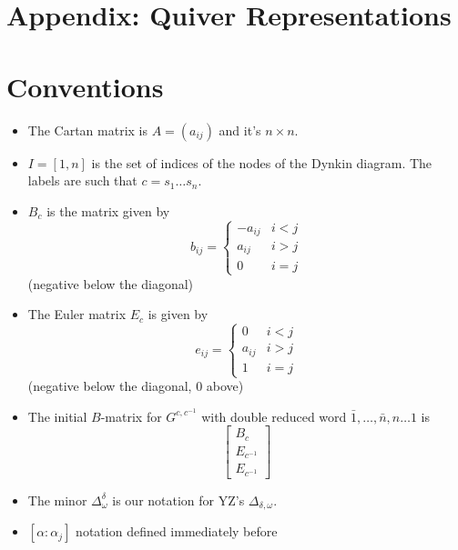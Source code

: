 \documentclass[12pt]{amsart}
\numberwithin{equation}{section}
\begin{document}
\section{Appendix: Quiver Representations}



\section{Conventions}

\begin{itemize}

  \item 
    The Cartan matrix is $A=(a_{ij})$ and it's $n \times n$.

  \item 
    $I=[1,n]$ is the set of indices of the nodes of the Dynkin diagram. The labels are such that $c=s_1\dots s_n$.

  \item 
    $B_c$ is the matrix given by
    \[
      b_{ij} = \begin{cases}
        -a_{ij} & i<j\\
        a_{ij}  & i>j\\
        0       & i=j
      \end{cases}
    \]
    (negative below the diagonal)

  \item
    The Euler matrix $E_c$ is given by
    \[
      e_{ij} = \begin{cases}
        0       & i<j\\
        a_{ij}  & i>j\\
        1       & i=j
      \end{cases}
    \]
    (negative below the diagonal, 0 above)

  \item
    The initial $B$-matrix for $G^{c,c^{-1}}$ with double reduced word $\bar 1,\dots,\bar n,n\dots 1$ is
    \[
      \left[
        \begin{array}{c}
          B_c\\
          E_{c^{-1}}\\
          E_{c^{-1}}
        \end{array}
      \right]
    \]
  
  \item 
    The minor $\Delta_\omega^\delta$ is our notation for YZ's $\Delta_{\delta, \omega}$.
  
  \item 
    $[\alpha:\alpha_j]$ notation defined immediately before 
  

\end{itemize}
\end{document}
